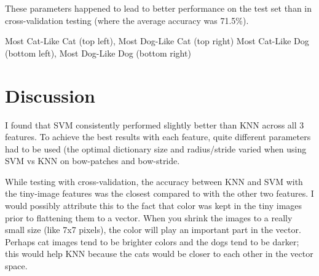 \documentclass[fleqn]{article}
\begin{document}
These parameters happened to lead to better performance on the test set than in cross-validation testing (where the average accuracy was 71.5\%).
\begin{center}
    Most Cat-Like Cat (top left), Most Dog-Like Cat (top right)\break
    Most Cat-Like Dog (bottom left), Most Dog-Like Dog (bottom right)
\end{center}



\section{Discussion}
I found that SVM consistently performed slightly better than KNN across all 3 features.  To achieve the best results with each feature, quite different parameters had to be used (the optimal dictionary size and radius/stride varied when using SVM vs KNN on bow-patches and bow-stride.

While testing with cross-validation, the accuracy between KNN and SVM with the tiny-image features was the closest compared to with the other two features.  I would possibly attribute this to the fact that color was kept in the tiny images prior to flattening them to a vector.  When you shrink the images to a really small size (like 7x7 pixels), the color will play an important part in the vector.  Perhaps cat images tend to be brighter colors and the dogs tend to be darker; this would help KNN because the cats would be closer to each other in the vector space.
\end{document}
